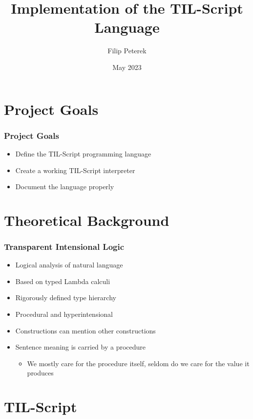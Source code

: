 \documentclass{beamer}
\title{Implementation of the TIL-Script Language}
\author{Filip Peterek}
\institute{VSB -- Technical University of Ostrava}
\date{May 2023}
\begin{document}
\frame{\titlepage}

\section{Project Goals}

\begin{frame}
    \frametitle{Project Goals}
    \begin{itemize}
        \item Define the TIL-Script programming language
        \item Create a working TIL-Script interpreter
        \item Document the language properly
    \end{itemize}
\end{frame}

\section{Theoretical Background}

\begin{frame}
    \frametitle{Transparent Intensional Logic}
    \begin{itemize}
        \item Logical analysis of natural language
        \item Based on typed Lambda calculi
        \item Rigorously defined type hierarchy
        \item Procedural and hyperintensional
        \item Constructions can mention other constructions
        \item Sentence meaning is carried by a procedure
            \begin{itemize}
                \item We mostly care for the procedure itself, seldom do we care for the value
                it produces
            \end{itemize}
    \end{itemize}
\end{frame}

\section{TIL-Script}
\end{document}
